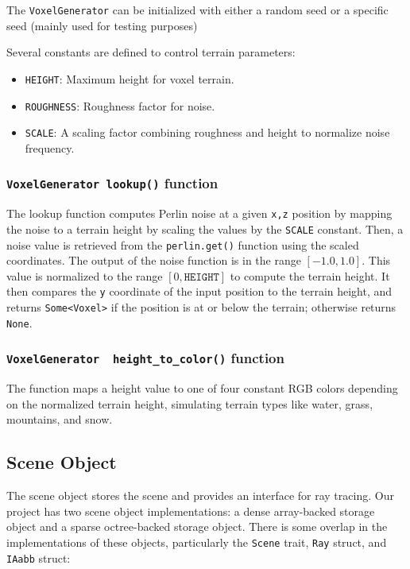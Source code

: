 \documentclass[conference]{IEEEtran}
\begin{document}
The \verb|VoxelGenerator| can be initialized with either a random seed or a specific seed (mainly used for testing purposes)

Several constants are defined to control terrain parameters:
\begin{itemize}
\item \verb|HEIGHT|: Maximum height for voxel terrain.
\item \verb|ROUGHNESS|: Roughness factor for noise.
\item \verb|SCALE|: A scaling factor combining roughness and height to normalize noise frequency.
\end{itemize}

\cprotect\subsubsection{\verb|VoxelGenerator lookup()| function}
The lookup function computes Perlin noise at a given \verb|x,z| position by mapping the noise to a terrain height by scaling the values by the \verb|SCALE| constant. 
Then, a noise value is retrieved from the \verb|perlin.get()| function using the scaled coordinates.
The output of the noise function is in the range $[-1.0, 1.0]$. This value is normalized to the range $[0, \texttt{HEIGHT}]$ to compute the terrain height. It then compares the \verb|y| coordinate of the input position to the terrain height, and returns \verb|Some<Voxel>| if the position is at or below the terrain; otherwise returns \verb|None|.

\cprotect\subsubsection{\verb|VoxelGenerator  height_to_color()| function}
The function maps a height value to one of four constant RGB colors depending on the normalized terrain height, simulating terrain types like water, grass, mountains, and snow.


\subsection{Scene Object}

The scene object stores the scene and provides an interface for ray tracing.
Our project has two scene object implementations: a dense array-backed storage object and a sparse octree-backed storage object.
There is some overlap in the implementations of these objects, particularly the \verb|Scene| trait, \verb|Ray| struct, and \verb|IAabb| struct:
\end{document}
